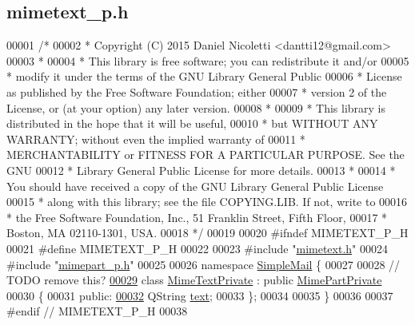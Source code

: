 \hypertarget{mimetext__p_8h_source}{}\subsection{mimetext\+\_\+p.\+h}
\label{mimetext__p_8h_source}

\begin{DoxyCode}
00001 \textcolor{comment}{/*}
00002 \textcolor{comment}{ * Copyright (C) 2015 Daniel Nicoletti <dantti12@gmail.com>}
00003 \textcolor{comment}{ *}
00004 \textcolor{comment}{ * This library is free software; you can redistribute it and/or}
00005 \textcolor{comment}{ * modify it under the terms of the GNU Library General Public}
00006 \textcolor{comment}{ * License as published by the Free Software Foundation; either}
00007 \textcolor{comment}{ * version 2 of the License, or (at your option) any later version.}
00008 \textcolor{comment}{ *}
00009 \textcolor{comment}{ * This library is distributed in the hope that it will be useful,}
00010 \textcolor{comment}{ * but WITHOUT ANY WARRANTY; without even the implied warranty of}
00011 \textcolor{comment}{ *  MERCHANTABILITY or FITNESS FOR A PARTICULAR PURPOSE. See the GNU}
00012 \textcolor{comment}{ * Library General Public License for more details.}
00013 \textcolor{comment}{ *}
00014 \textcolor{comment}{ * You should have received a copy of the GNU Library General Public License}
00015 \textcolor{comment}{ * along with this library; see the file COPYING.LIB. If not, write to}
00016 \textcolor{comment}{ * the Free Software Foundation, Inc., 51 Franklin Street, Fifth Floor,}
00017 \textcolor{comment}{ * Boston, MA 02110-1301, USA.}
00018 \textcolor{comment}{ */}
00019 
00020 \textcolor{preprocessor}{#ifndef MIMETEXT\_P\_H}
00021 \textcolor{preprocessor}{#define MIMETEXT\_P\_H}
00022 
00023 \textcolor{preprocessor}{#include "\hyperlink{mimetext_8h}{mimetext.h}"}
00024 \textcolor{preprocessor}{#include "\hyperlink{mimepart__p_8h}{mimepart\_p.h}"}
00025 
00026 \textcolor{keyword}{namespace }\hyperlink{namespace_simple_mail}{SimpleMail} \{
00027 
00028 \textcolor{comment}{// TODO remove this?}
\hyperlink{class_simple_mail_1_1_mime_text_private}{00029} \textcolor{keyword}{class }\hyperlink{class_simple_mail_1_1_mime_text_private}{MimeTextPrivate} : \textcolor{keyword}{public} \hyperlink{class_simple_mail_1_1_mime_part_private}{MimePartPrivate}
00030 \{
00031 \textcolor{keyword}{public}:
\hyperlink{class_simple_mail_1_1_mime_text_private_a0df65c3c8ea26418893245c22394dc7f}{00032}     QString \hyperlink{class_simple_mail_1_1_mime_text_private_a0df65c3c8ea26418893245c22394dc7f}{text};
00033 \};
00034 
00035 \}
00036 
00037 \textcolor{preprocessor}{#endif // MIMETEXT\_P\_H}
00038 
\end{DoxyCode}
